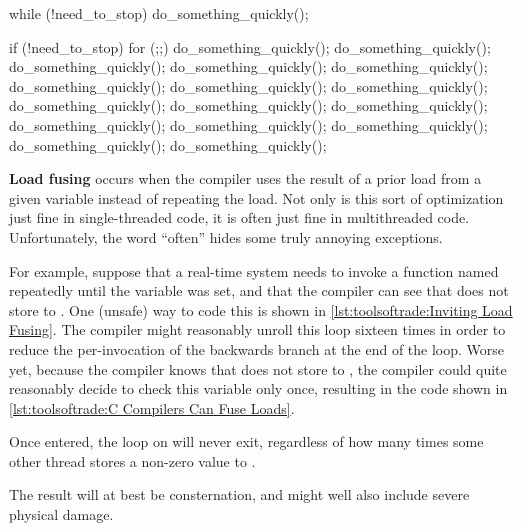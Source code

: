 \begin{listing}
\begin{fcvlabel}
\begin{VerbatimL}[commandchars=\\\{\}]
while (!need_to_stop)
	do_something_quickly();
\end{VerbatimL}
\end{fcvlabel}
\caption{Inviting Load Fusing}
\label{lst:toolsoftrade:Inviting Load Fusing}
\end{listing}

\begin{listing}
\begin{fcvlabel}
\begin{VerbatimL}[commandchars=\\\[\]]
if (!need_to_stop)
	for (;;) {\lnlbl[loop:b]
		do_something_quickly();
		do_something_quickly();
		do_something_quickly();
		do_something_quickly();
		do_something_quickly();
		do_something_quickly();
		do_something_quickly();
		do_something_quickly();
		do_something_quickly();
		do_something_quickly();
		do_something_quickly();
		do_something_quickly();
		do_something_quickly();
		do_something_quickly();
		do_something_quickly();
		do_something_quickly();
	}\lnlbl[loop:e]
\end{VerbatimL}
\end{fcvlabel}
\caption{C Compilers Can Fuse Loads}
\label{lst:toolsoftrade:C Compilers Can Fuse Loads}
\end{listing}

{\bf Load fusing} occurs when the compiler uses the result of a
prior load from a given variable instead of repeating the load.
Not only is this sort of optimization just fine in single-threaded
code, it is often just fine in multithreaded code.
Unfortunately, the word ``often'' hides some truly annoying exceptions.

For example, suppose that a real-time system needs to invoke a
function named  repeatedly until the
variable  was set, and that the compiler can see
that  does not store to .
One (unsafe) way to code this is shown in
\cref{lst:toolsoftrade:Inviting Load Fusing}.
The compiler might reasonably unroll this loop sixteen times in order
to reduce the per-invocation of the backwards branch at the end of the
loop.
Worse yet, because the compiler knows that 
does not store to , the compiler could quite reasonably
decide to check this variable only once, resulting in the code shown in
\cref{lst:toolsoftrade:C Compilers Can Fuse Loads}.
\begin{fcvref}
Once entered, the loop on
 will never exit, regardless of how
many times some other thread stores a non-zero value to .
\end{fcvref}
The result will at best be consternation, and might well also
include severe physical damage.

